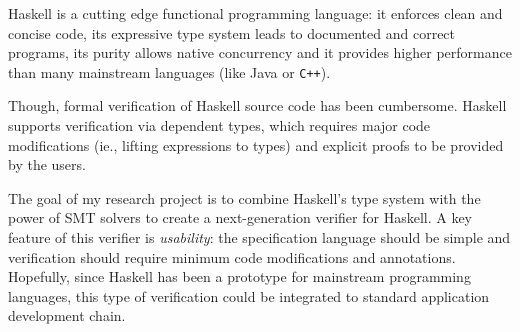 Haskell is a cutting edge functional programming language:
it enforces clean and concise code,
its expressive type system leads to documented and correct programs, 
its purity allows native concurrency and 
it provides higher performance than many mainstream languages (like Java or \verb!C++!). 


Though, formal verification of Haskell source code has been cumbersome.
Haskell supports verification via dependent types, which requires  
major code modifications (ie., lifting expressions to types)
and explicit proofs to be provided by the users.
%

The goal of my research project is to combine Haskell's type system with 
the power of SMT solvers to 
create a next-generation verifier for Haskell.
%
A key feature of this verifier is  \textit{usability}:
the specification language should be simple and 
verification should require minimum code modifications and annotations. 
%
Hopefully, since Haskell has been a prototype for mainstream programming languages,
this type of verification could be 
integrated to standard application development chain.
